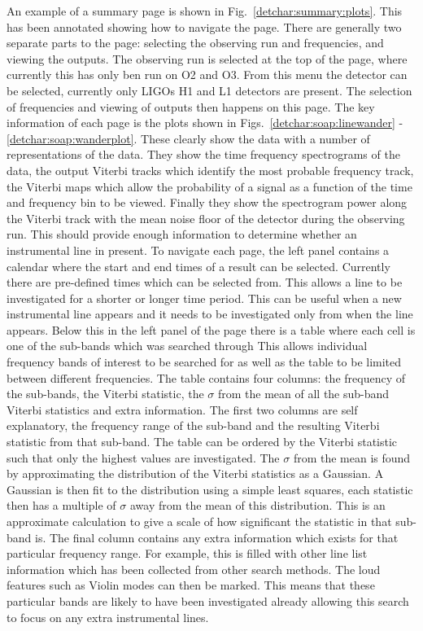 An example of a summary page is shown in Fig.~\ref{detchar:summary:plots}. This has been annotated showing how to navigate the page. 
There are generally two separate parts to the page: selecting the observing run and frequencies, and viewing the outputs.
The observing run is selected at the top of the page, where currently this has only ben run on O2 and O3. 
From this menu the detector can be selected, currently only \glspl{LIGO} H1 and L1 detectors are present.
The selection of frequencies and viewing of outputs then happens on this page.
The key information of each page is the plots shown in Figs.~\ref{detchar:soap:linewander} - \ref{detchar:soap:wanderplot}.
These clearly show the data with a number of representations of the data. They show the time frequency spectrograms of the data, the output Viterbi tracks which identify the most probable frequency track, the Viterbi maps which allow the probability of a signal as a function of the time and frequency bin to be viewed. 
Finally they show the spectrogram power along the Viterbi track with the mean noise floor of the detector during the observing run.
This should provide enough information to determine whether an instrumental line in present.
To navigate each page, the left panel contains a calendar where the start and end times of a result can be selected. 
Currently there are pre-defined times which can be selected from. This allows a line to be investigated for a shorter or longer time period.
This can be useful when a new instrumental line appears and it needs to be investigated only from when the line appears. 
Below this in the left panel of the page there is a table where each cell is one of the sub-bands which was searched through 
This allows individual frequency bands of interest to be searched for as well as the table to be limited between different frequencies.
The table contains four columns: the frequency of the sub-bands, the Viterbi statistic, the $\sigma$ from the mean of all the sub-band Viterbi statistics and extra information.
The first two columns are self explanatory, the frequency range of the sub-band and the resulting Viterbi statistic from that sub-band. The table can be ordered by the Viterbi statistic such that only the highest values are investigated.
The $\sigma$ from the mean is found by approximating the distribution of the Viterbi statistics as a Gaussian. 
A Gaussian is then fit to the distribution using a simple least squares, each statistic then has a multiple of $\sigma$ away from the mean of this distribution. 
This is an approximate calculation to give a scale of how significant the statistic in that sub-band is.
The final column contains any extra information which exists for that particular frequency range.
For example, this is filled with other line list information which has been collected from other search methods.
The loud features such as Violin modes can then be marked. This means that these particular bands are likely to have been investigated already allowing this search to focus on any extra instrumental lines.



